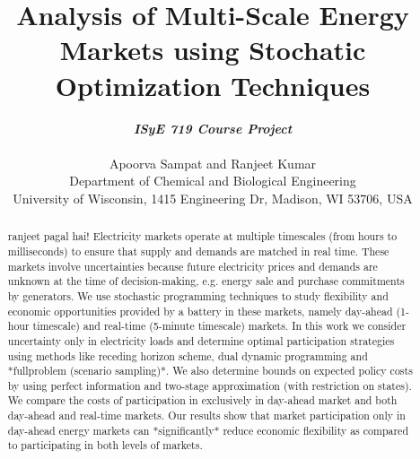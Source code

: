 \documentclass[11pt,twoside]{article}
\begin{document}
\title{Analysis of Multi-Scale Energy Markets using Stochatic Optimization Techniques}

\author{\textbf{\textit{ISyE 719 Course Project}}\\ \\Apoorva Sampat and Ranjeet Kumar\\
 {\small Department of Chemical and Biological Engineering}\\
 {\small \;University of Wisconsin, 1415 Engineering Dr, Madison, WI 53706, USA}}
\date{}
\maketitle

\begin{abstract}
ranjeet pagal hai!
Electricity markets operate at multiple timescales (from hours to milliseconds) to ensure that supply and demands are matched in real time. These markets involve uncertainties because future electricity prices and demands are unknown at the time of decision-making, e.g. energy sale and purchase commitments by generators. We use stochastic programming techniques to study flexibility and economic opportunities provided by a battery in these markets, namely day-ahead (1-hour timescale) and real-time (5-minute timescale) markets. In this work we consider uncertainty only in electricity loads and determine optimal participation strategies using methods like receding horizon scheme, dual dynamic programming and *fullproblem (scenario sampling)*. We also determine bounds on expected policy costs by using perfect information and two-stage approximation (with restriction on states). We compare the costs of participation in exclusively in day-ahead market and both day-ahead and real-time markets. Our results show that market participation only in day-ahead energy markets can *significantly* reduce economic flexibility as compared to participating in both levels of markets.
\end{abstract}
\end{document}
